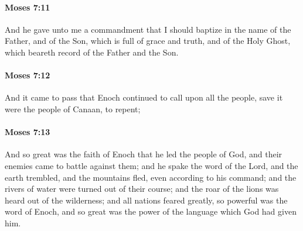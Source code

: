 		\paragraph{Moses 7:11} %
			\label{MOSES-7-11}

			And he gave unto me a commandment that I should baptize in the name of the Father, and of the Son, which is full of grace and truth, and of the Holy Ghost, which beareth record of the Father and the Son.


		\paragraph{Moses 7:12} %
			\label{MOSES-7-12}

			And it came to pass that Enoch continued to call upon all the people, save it were the people of Canaan, to repent;


		\paragraph{Moses 7:13} %
			\label{MOSES-7-13}

			And so great was the faith of Enoch that he led the people of God, and their enemies came to battle against them; and he spake the word of the Lord, and the earth trembled, and the mountains fled, even according to his command; and the rivers of water were turned out of their course; and the roar of the lions was heard out of the wilderness; and all nations feared greatly, so powerful was the word of Enoch, and so great was the power of the language which God had given him.

